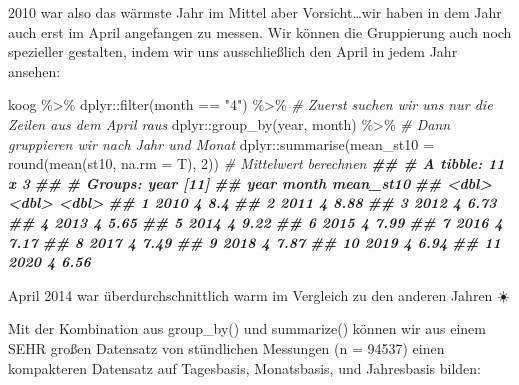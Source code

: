 \documentclass[
]{article}
\newenvironment{Shaded}{\begin{snugshade}}{\end{snugshade}}
\newcommand{\AttributeTok}[1]{\textcolor[rgb]{0.77,0.63,0.00}{#1}}
\newcommand{\CommentTok}[1]{\textcolor[rgb]{0.56,0.35,0.01}{\textit{#1}}}
\newcommand{\DecValTok}[1]{\textcolor[rgb]{0.00,0.00,0.81}{#1}}
\newcommand{\DocumentationTok}[1]{\textcolor[rgb]{0.56,0.35,0.01}{\textbf{\textit{#1}}}}
\newcommand{\FunctionTok}[1]{\textcolor[rgb]{0.00,0.00,0.00}{#1}}
\newcommand{\NormalTok}[1]{#1}
\newcommand{\SpecialCharTok}[1]{\textcolor[rgb]{0.00,0.00,0.00}{#1}}
\newcommand{\StringTok}[1]{\textcolor[rgb]{0.31,0.60,0.02}{#1}}
\begin{document}
2010 war also das wärmste Jahr im Mittel aber Vorsicht\ldots wir haben in dem Jahr auch erst im April angefangen zu messen. Wir können die Gruppierung auch noch spezieller gestalten, indem wir uns ausschließlich den April in jedem Jahr ansehen:

\begin{Shaded}
\begin{Highlighting}[]
\NormalTok{koog }\SpecialCharTok{\%\textgreater{}\%}
\NormalTok{  dplyr}\SpecialCharTok{::}\FunctionTok{filter}\NormalTok{(month }\SpecialCharTok{==} \StringTok{"4"}\NormalTok{) }\SpecialCharTok{\%\textgreater{}\%} \CommentTok{\# Zuerst suchen wir uns nur die Zeilen aus dem April raus}
\NormalTok{  dplyr}\SpecialCharTok{::}\FunctionTok{group\_by}\NormalTok{(year, month) }\SpecialCharTok{\%\textgreater{}\%} \CommentTok{\# Dann gruppieren wir nach Jahr und Monat}
\NormalTok{  dplyr}\SpecialCharTok{::}\FunctionTok{summarise}\NormalTok{(}\AttributeTok{mean\_st10 =} \FunctionTok{round}\NormalTok{(}\FunctionTok{mean}\NormalTok{(st10, }\AttributeTok{na.rm =}\NormalTok{ T), }\DecValTok{2}\NormalTok{)) }\CommentTok{\# Mittelwert berechnen}
\DocumentationTok{\#\# \# A tibble: 11 x 3}
\DocumentationTok{\#\# \# Groups:   year [11]}
\DocumentationTok{\#\#     year month mean\_st10}
\DocumentationTok{\#\#    \textless{}dbl\textgreater{} \textless{}dbl\textgreater{}     \textless{}dbl\textgreater{}}
\DocumentationTok{\#\#  1  2010     4      8.4 }
\DocumentationTok{\#\#  2  2011     4      8.88}
\DocumentationTok{\#\#  3  2012     4      6.73}
\DocumentationTok{\#\#  4  2013     4      5.65}
\DocumentationTok{\#\#  5  2014     4      9.22}
\DocumentationTok{\#\#  6  2015     4      7.99}
\DocumentationTok{\#\#  7  2016     4      7.17}
\DocumentationTok{\#\#  8  2017     4      7.49}
\DocumentationTok{\#\#  9  2018     4      7.87}
\DocumentationTok{\#\# 10  2019     4      6.94}
\DocumentationTok{\#\# 11  2020     4      6.56}
\end{Highlighting}
\end{Shaded}

April 2014 war überdurchschnittlich warm im Vergleich zu den anderen Jahren ☀️

Mit der Kombination aus group\_by() und summarize() können wir aus einem SEHR großen Datensatz von stündlichen Messungen (n = 94537) einen kompakteren Datensatz auf Tagesbasis, Monatsbasis, und Jahresbasis bilden:
\end{document}
